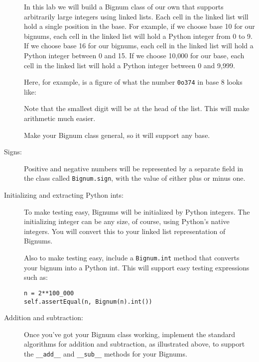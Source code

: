 \documentclass{article}
\begin{document}
\begin{description}
In this lab we will build a Bignum class of our own that supports arbitrarily large integers
using linked lists.  Each cell in the linked list will hold a single position in
the base.  For example, if we choose base 10 for our bignums, each
cell in the linked list will hold a Python integer from 0 to 9.  If we choose
base 16 for our bignums, each cell in the linked list will hold a 
Python integer between 0 and 15.  If we choose 10,000 for our base,
each cell in the linked list will hold a Python integer between 0 and 9,999.

Here, for example, is a figure of what the number \lstinline{0o374} in base 8
looks like:

\begin{center}
\end{center}

Note that the smallest digit will be at the head of the list.  This will make arithmetic
much easier.

Make your Bignum class general, so it will support any base.

\item[Signs:]  Positive and negative numbers will be represented by
a separate field in the class called \lstinline{Bignum.sign}, with the value
of either plus or minus one.

\item[Initializing and extracting Python ints:]  To make testing easy, Bignums will be initialized
by Python integers.  The initializing integer can be any size, of course,
using Python's native integers.  You will convert this to your linked list
representation of Bignums.

Also to make testing easy, include a \lstinline{Bignum.int} method that
converts your bignum into a Python int.  This will support easy testing
expressions such as:
\begin{lstlisting}
n = 2**100_000
self.assertEqual(n, Bignum(n).int())
\end{lstlisting}

\item[Addition and subtraction:]  Once you've got your Bignum class
working, 
implement the standard algorithms for addition and subtraction, as illustrated
above, to support the \lstinline{__add__} and \lstinline{__sub__} methods
for your Bignums.  


\end{description}
\end{document}
